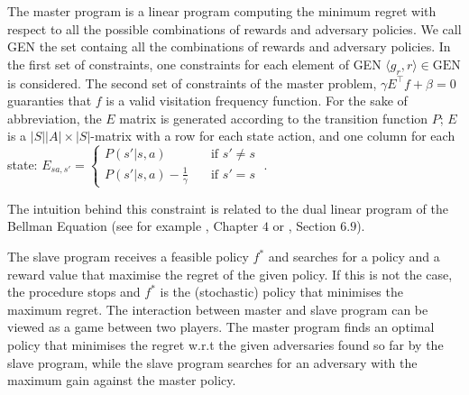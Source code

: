 \documentclass[sigconf]{aamas}  %
\begin{document}
The master program is a linear program computing the minimum regret with respect to all the possible combinations of rewards and adversary policies. We call GEN the set containg all the combinations of rewards and adversary policies. 
In the first set of constraints, one constraints for each element of GEN $\langle g_r, r \rangle \in \text{GEN}$ is considered. 
The second set of constraints of the master problem, $\gamma E ^{\top}f+ \beta = 0$ guaranties that $f$ is a valid visitation frequency function. For the sake of abbreviation, the $E$ matrix is generated according to the transition function $P$; $E$ is a $|S||A| \times |S|$-matrix with a row for each state action, and one column for each state: $E_{sa,s'} = 
     \begin{cases}
       P(s'|s, a) &\quad \text{if } s' \neq s\\
       P(s'|s, a) - \frac{1}{\gamma} &\quad \text{if } s' = s
     \end{cases}\;.$
     
The intuition behind this constraint is related to the dual linear program of the Bellman Equation (see for example \cite{Sutton1998}, Chapter $4$ or \citep{Puterman1994}, Section $6.9$). 


The slave program receives a feasible policy $f^*$ and 
searches for a policy and a reward value that maximise the regret of the given policy.
If this is not the case, the procedure stops and $f^*$ is the (stochastic) policy that minimises the maximum regret. 
The interaction between master and slave program  can be viewed as a game between two players. The master program  finds an optimal policy that minimises the regret  w.r.t the given adversaries found so far by the slave program, while the slave program searches for an adversary with the maximum gain against the master policy. 
\end{document}
